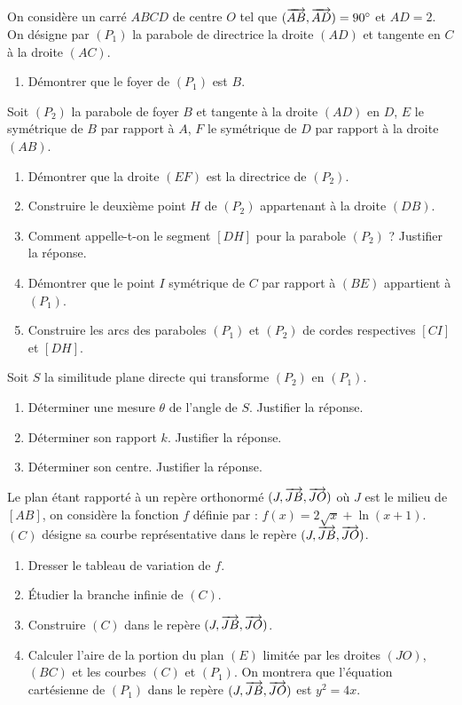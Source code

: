 \documentclass[11pt]{article}
\begin{document}
On considère un carré $ABCD$ de centre $O$ tel que $(\overrightarrow{AB},\overrightarrow{AD}) = 90^\circ$ et $AD = 2$. On désigne par $(P_1)$ la parabole de directrice la droite $(AD)$ et tangente en $C$ à la droite $(AC)$.

\begin{enumerate}
  \item Démontrer que le foyer de $(P_1)$ est $B$.
\end{enumerate}

Soit $(P_2)$ la parabole de foyer $B$ et tangente à la droite $(AD)$ en $D$, $E$ le symétrique de $B$ par rapport à $A$, $F$ le symétrique de $D$ par rapport à la droite $(AB)$.

\begin{enumerate}[start=2]
  \item Démontrer que la droite $(EF)$ est la directrice de $(P_2)$.
  \item Construire le deuxième point $H$ de $(P_2)$ appartenant à la droite $(DB)$.
  \item Comment appelle-t-on le segment $[DH]$ pour la parabole $(P_2)$ ? Justifier la réponse.
  \item Démontrer que le point $I$ symétrique de $C$ par rapport à $(BE)$ appartient à $(P_1)$.
  \item Construire les arcs des paraboles $(P_1)$ et $(P_2)$ de cordes respectives $[CI]$ et $[DH]$.
\end{enumerate}

Soit $S$ la similitude plane directe qui transforme $(P_2)$ en $(P_1)$.

\begin{enumerate}[start=7]
  \item Déterminer une mesure $\theta$ de l'angle de $S$. Justifier la réponse.
  \item Déterminer son rapport $k$. Justifier la réponse.
  \item Déterminer son centre. Justifier la réponse.
\end{enumerate}

Le plan étant rapporté à un repère orthonormé $(J,\overrightarrow{JB},\overrightarrow{JO})$ où $J$ est le milieu de $[AB]$, on considère la fonction $f$ définie par : $f(x) = 2\sqrt{x} + \ln(x+1)$. $(C)$ désigne sa courbe représentative dans le repère $(J,\overrightarrow{JB},\overrightarrow{JO})$.

\begin{enumerate}[start=10]
  \item Dresser le tableau de variation de $f$.
  \item Étudier la branche infinie de $(C)$.
  \item Construire $(C)$ dans le repère $(J,\overrightarrow{JB},\overrightarrow{JO})$.
  \item Calculer l'aire de la portion du plan $(E)$ limitée par les droites $(JO)$, $(BC)$ et les courbes $(C)$ et $(P_1)$. On montrera que l'équation cartésienne de $(P_1)$ dans le repère $(J,\overrightarrow{JB},\overrightarrow{JO})$ est $y^2 = 4x$.
\end{enumerate}
\end{document}
